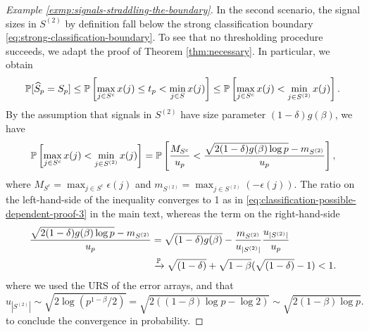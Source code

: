 \begin{example}
\begin{proof}[Example \ref{exmp:signals-straddling-the-boundary}]
In the second scenario, the signal sizes in $S^{(2)}$ by definition fall below the strong classification boundary \eqref{eq:strong-classification-boundary}.
To see that no thresholding procedure succeeds, we adapt the proof of Theorem \ref{thm:necessary}.
In particular, we obtain
$$
    \P[\widehat{S}_p = S_p] 
    \le \P\left[\max_{j\in S^c}x(j) \le t_p < \min_{j\in S}x(j)\right]
    \le \P\left[\max_{j\in S^c}x(j) < \min_{j\in S^{(2)}}x(j)\right].
$$
By the assumption that signals in $S^{(2)}$ have size parameter $(1-\delta)g(\beta)$, we have
\begin{equation}
\P\left[\max_{j\in S^c}x(j) < \min_{j\in S^{(2)}}x(j)\right]
= \P\left[ \frac{M_{S^{c}}}{u_p} < \frac{\sqrt{2(1-\delta)g(\beta)\log{p}} - m_{S^{(2)}}}{u_p}\right], 
\end{equation}
where $M_{S^{c}} = \max_{j\in S^{c}}\epsilon(j)$ and $m_{S^{(2)}} = \max_{j\in S^{(2)}}\left(-\epsilon(j)\right)$.
The ratio on the left-hand-side of the inequality converges to 1 as in \eqref{eq:classification-possible-dependent-proof-3} in the main text, whereas the term on the right-hand-side
\begin{align*}
    \frac{\sqrt{2(1-\delta)g(\beta)\log{p}} - m_{S^{(2)}}}{u_p} 
    &= \sqrt{(1-\delta)g(\beta)} - \frac{m_{S^{(2)}}}{u_{|S^{(2)}|}} \frac{u_{|S^{(2)}|}}{u_p} \\
    &\xrightarrow{\P} \sqrt{(1-\delta)} + \sqrt{1-\beta}(\sqrt{(1-\delta)} - 1) < 1.
\end{align*}
where we used the URS of the error arrays, and that 
$$
u_{|S^{(2)}|} \sim \sqrt{2\log{(p^{1-\beta}/2)}} 
= \sqrt{2(({1-\beta})\log{p}-\log2)} \sim \sqrt{2({1-\beta})\log{p}}.
$$
to conclude the convergence in probability.
\end{proof}
\end{example}

